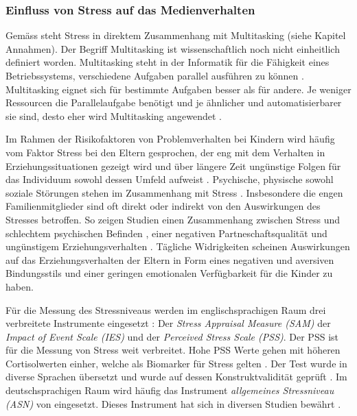 \subsubsection{Einfluss von Stress auf das Medienverhalten}
Gemäss  steht Stress in direktem Zusammenhang mit Multitasking (siehe Kapitel Annahmen). Der Begriff Multitasking ist wissenschaftlich noch nicht einheitlich definiert worden. Multitasking steht in der Informatik für die Fähigkeit eines Betriebssystems, verschiedene Aufgaben parallel ausführen zu können \cite{Zimber2016}. Multitasking eignet sich für bestimmte Aufgaben besser als für andere. Je weniger Ressourcen die Parallelaufgabe benötigt und je ähnlicher und automatisierbarer sie sind, desto eher wird Multitasking angewendet \cite[S.~10]{Zimber2016}.

Im Rahmen der Risikofaktoren von Problemverhalten bei Kindern wird häufig vom Faktor Stress bei den Eltern gesprochen, der eng mit dem Verhalten in Erziehungssituationen gezeigt wird und über längere Zeit ungünstige Folgen für das Individuum sowohl dessen Umfeld aufweist \cite{Cina2009}. Psychische, physische sowohl soziale Störungen stehen im Zusammenhang mit Stress \cite{Elfering2002, Burisch1994}. Insbesondere die engen Familienmitglieder sind oft direkt oder indirekt von den Auswirkungen des Stresses betroffen. So zeigen Studien einen Zusammenhang zwischen Stress und schlechtem psychischen Befinden \cite{Burisch1994, Krohne1997}, einer negativen Partneschaftsqualität \cite{Bodenmann2000, Bodenmann1999, Bodenmann2000a} und ungünstigem Erziehungsverhalten \cite{Abidin1992, Belsky1984, WebsterStratton2000}. Tägliche Widrigkeiten scheinen Auswirkungen auf das Erziehungsverhalten der Eltern in Form eines negativen und aversiven Bindungsstils \cite{Dumas1989, Webster-Stratton1988} und einer geringen emotionalen Verfügbarkeit für die Kinder \cite{Campbell1991} zu haben.

Für die Messung des Stressniveaus werden im englischsprachigen Raum drei verbreitete Instrumente eingesetzt \cite{Andreou2011}: Der \textit{Stress Appraisal Measure (SAM)} der \textit{Impact of Event Scale (IES)} und der \textit{Perceived Stress Scale (PSS)}. Der PSS ist für die Messung von Stress weit verbreitet. Hohe PSS Werte gehen mit höheren Cortisolwerten einher, welche als Biomarker für Stress gelten \cite{Malarkey1995, VanEck2005}. Der Test wurde in diverse Sprachen übersetzt und wurde auf dessen Konstruktvalidität geprüft \cite{Cohen1988, Byrne2005}. Im deutschsprachigen Raum wird häufig das Instrument \textit{allgemeines Stressniveau (ASN)} von  eingesetzt. Dieses Instrument hat sich in diversen Studien bewährt \cite{Cina2009}.
 
